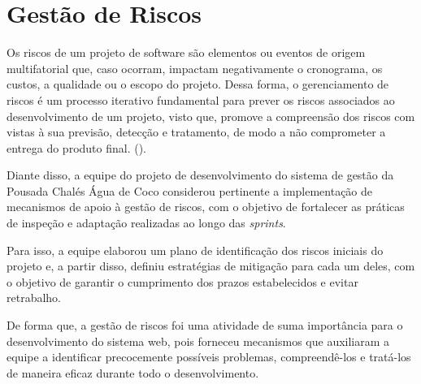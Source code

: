 \documentclass[
	12pt,				%
	openany,			%
	oneside,			%
	a4paper,			%
	english,			%
	french,				%
	spanish,			%
	brazil				%
	]{abntex2}
\begin{document}
\section{Gestão de Riscos}
Os riscos de um projeto de software são elementos ou eventos de origem multifatorial que, caso ocorram, impactam negativamente  o cronograma, os custos, a qualidade ou o escopo do projeto. Dessa forma, o gerenciamento de riscos é um processo iterativo fundamental para prever os riscos associados ao desenvolvimento de um projeto, visto que, promove a compreensão dos riscos com vistas à sua previsão, detecção e tratamento, de modo a não comprometer a entrega do produto final. (\cite[p. 416]{sommerville2011}).

Diante disso, a equipe do projeto de desenvolvimento do sistema de gestão da Pousada Chalés Água de Coco considerou pertinente a implementação de mecanismos de apoio à gestão de riscos, com o objetivo de fortalecer as práticas de inspeção e adaptação realizadas ao longo das \textit{sprints}.

Para isso, a equipe elaborou um plano de identificação dos riscos iniciais do projeto e, a partir disso, definiu estratégias de mitigação para cada um deles, com o objetivo de garantir o cumprimento dos prazos estabelecidos e evitar retrabalho.

De forma que, a gestão de riscos foi uma atividade de suma importância para o desenvolvimento do sistema web, pois forneceu mecanismos que auxiliaram a equipe a identificar precocemente possíveis problemas, compreendê-los e tratá-los de maneira eficaz durante todo o desenvolvimento. 
\end{document}
